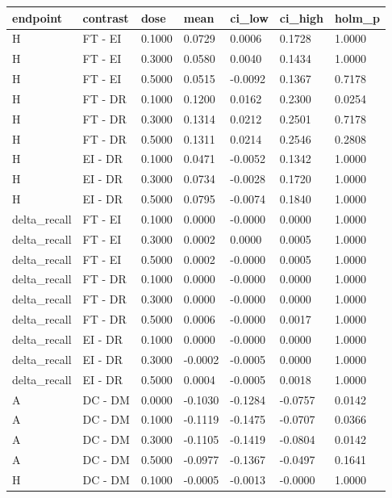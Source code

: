 \documentclass[
  10pt,
  a4paper,
]{article}
\begin{document}
\begin{longtable}[]{@{}lllllll@{}}
\toprule
endpoint & contrast & dose & mean & ci\_low & ci\_high & holm\_p \\
\midrule
\endhead
H & FT - EI & 0.1000 & 0.0729 & 0.0006 & 0.1728 & 1.0000 \\
H & FT - EI & 0.3000 & 0.0580 & 0.0040 & 0.1434 & 1.0000 \\
H & FT - EI & 0.5000 & 0.0515 & -0.0092 & 0.1367 & 0.7178 \\
H & FT - DR & 0.1000 & 0.1200 & 0.0162 & 0.2300 & 0.0254 \\
H & FT - DR & 0.3000 & 0.1314 & 0.0212 & 0.2501 & 0.7178 \\
H & FT - DR & 0.5000 & 0.1311 & 0.0214 & 0.2546 & 0.2808 \\
H & EI - DR & 0.1000 & 0.0471 & -0.0052 & 0.1342 & 1.0000 \\
H & EI - DR & 0.3000 & 0.0734 & -0.0028 & 0.1720 & 1.0000 \\
H & EI - DR & 0.5000 & 0.0795 & -0.0074 & 0.1840 & 1.0000 \\
delta\_recall & FT - EI & 0.1000 & 0.0000 & -0.0000 & 0.0000 & 1.0000 \\
delta\_recall & FT - EI & 0.3000 & 0.0002 & 0.0000 & 0.0005 & 1.0000 \\
delta\_recall & FT - EI & 0.5000 & 0.0002 & -0.0000 & 0.0005 & 1.0000 \\
delta\_recall & FT - DR & 0.1000 & 0.0000 & -0.0000 & 0.0000 & 1.0000 \\
delta\_recall & FT - DR & 0.3000 & 0.0000 & -0.0000 & 0.0000 & 1.0000 \\
delta\_recall & FT - DR & 0.5000 & 0.0006 & -0.0000 & 0.0017 & 1.0000 \\
delta\_recall & EI - DR & 0.1000 & 0.0000 & -0.0000 & 0.0000 & 1.0000 \\
delta\_recall & EI - DR & 0.3000 & -0.0002 & -0.0005 & 0.0000 &
1.0000 \\
delta\_recall & EI - DR & 0.5000 & 0.0004 & -0.0005 & 0.0018 & 1.0000 \\
A & DC - DM & 0.0000 & -0.1030 & -0.1284 & -0.0757 & 0.0142 \\
A & DC - DM & 0.1000 & -0.1119 & -0.1475 & -0.0707 & 0.0366 \\
A & DC - DM & 0.3000 & -0.1105 & -0.1419 & -0.0804 & 0.0142 \\
A & DC - DM & 0.5000 & -0.0977 & -0.1367 & -0.0497 & 0.1641 \\
H & DC - DM & 0.1000 & -0.0005 & -0.0013 & -0.0000 & 1.0000 \\

\end{longtable}
\end{document}
